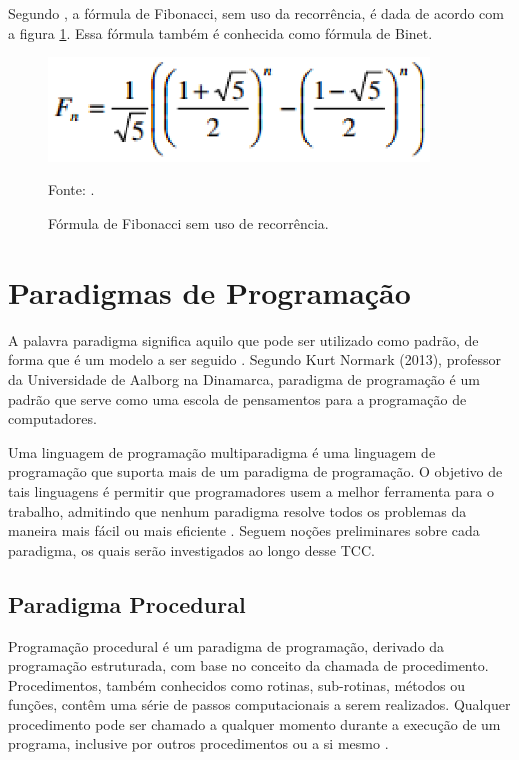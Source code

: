 Segundo , a fórmula de Fibonacci, sem uso da recorrência, é dada de acordo com a figura \ref{formulaFibonacci}. Essa fórmula também é conhecida como fórmula de Binet.

\begin{figure}[htp]
\centering
\includegraphics[width=0.9\textwidth]{figuras/formulaFibonacci}
\caption{Fórmula de Fibonacci sem uso de recorrência.}{Fonte: .} 
\label{formulaFibonacci}
\end{figure}

\section{Paradigmas de Programação}

A palavra paradigma significa aquilo que pode ser utilizado como padrão, de forma que é um modelo a ser seguido \cite{ferreira1986}. Segundo  Kurt Normark (2013), professor da Universidade de Aalborg na Dinamarca, paradigma de programação é um padrão que serve como uma escola de pensamentos para a programação de computadores.



Uma linguagem de programação multiparadigma é uma linguagem de programação que suporta mais de um paradigma de programação. O objetivo de tais linguagens é permitir que programadores usem a melhor ferramenta para o trabalho, admitindo que nenhum paradigma  resolve todos os problemas da maneira mais fácil ou mais eficiente \cite[pág.~21]{paquet2010}. Seguem noções preliminares sobre cada paradigma, os quais serão investigados ao longo desse TCC.

\subsection{Paradigma Procedural}

Programação procedural é um paradigma de programação, derivado da programação estruturada, com base no conceito da chamada de procedimento. Procedimentos, também conhecidos como rotinas, sub-rotinas, métodos ou funções, contêm uma série de passos computacionais a serem realizados. Qualquer procedimento pode ser chamado a qualquer momento durante a execução de um programa, inclusive por outros procedimentos ou a si mesmo \cite[pág.~22]{paquet2010}.

